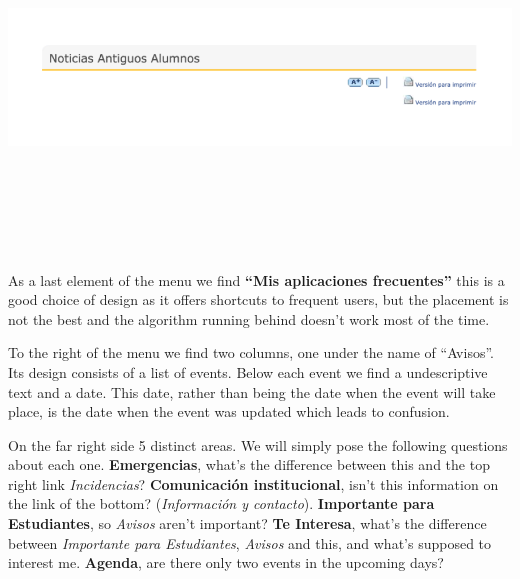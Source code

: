 \documentclass{article}
\begin{document}
\includegraphics[width=15cm, height=10cm, keepaspectratio]{noticiasantiguos}
As a last element of the menu we find \textbf{“Mis aplicaciones frecuentes”} this is a good choice of design as it offers shortcuts to frequent users, but the placement is not the best and the algorithm running behind doesn’t work most of the time.


To the right of the menu we find two columns, one under the name of “Avisos”. Its design consists of a list of events. Below each event we find a undescriptive text and a date. This date, rather than being the date when the event will take place, is the date when the event was updated which leads to confusion.

On the far right side 5 distinct areas. We will simply pose the following questions about each one.
\textbf{Emergencias}, what’s the difference between this and the top right link \textit{Incidencias}? \textbf{Comunicación institucional}, isn’t this information on the link of the bottom? (\textit{Información y contacto}).
\textbf{Importante para Estudiantes}, so \textit{Avisos} aren’t important?
\textbf{Te Interesa}, what’s the difference between \textit{Importante para Estudiantes}, \textit{Avisos} and this, and what’s supposed to interest me.
\textbf{Agenda}, are there only two events in the upcoming days?\\
\end{document}
